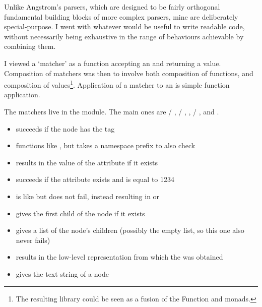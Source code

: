Unlike Angstrom's parsers, which are designed to be fairly orthogonal fundamental building blocks of more complex parsers, mine are deliberately special-purpose. I went with whatever would be useful to write readable code, without necessarily being exhaustive in the range of behaviours achievable by combining them.

I viewed a `matcher' as a function accepting an  and returning a  value. Composition of matchers was then to involve both composition of functions, and composition of  values\footnote{The resulting library could be seen as a fusion of the Function and  monads.}. Application of a matcher to an  is simple function application.

The matchers live in the  module. The main ones are  / ,  / , ,  / ,  and .

\begin{itemize}
  \item {} succeeds if the node has the  tag

  \item {} functions like , but takes a namespace prefix to also check

  \item {} results in the value of the  attribute if it exists

  \item {} succeeds if the  attribute exists and is equal to 1234

  \item {} is like  but does not fail, instead resulting in  or 

  \item {} gives the first child of the node if it exists

  \item {} gives a list of the node's children (possibly the empty list, so this one also never fails)

  \item {} results in the low-level  representation from which the  was obtained

  \item {} gives the text string of a  node
\end{itemize}

